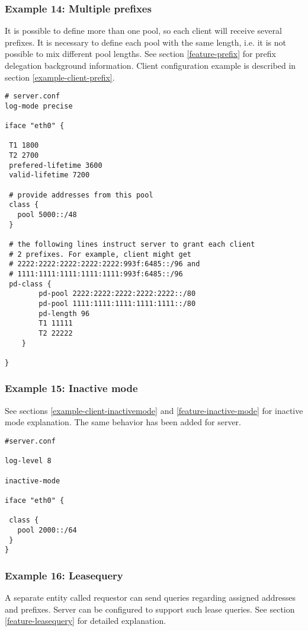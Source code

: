 \subsubsection{Example 14: Multiple prefixes}
\label{example-server-prefixes}
It is possible to define more than one pool, so each client will
receive several prefixes. It is necessary to define each pool with the
same length, i.e. it is not possible to mix different pool lengths.
See section \ref{feature-prefix} for prefix delegation background
information. Client configuration example is described in section
\ref{example-client-prefix}.

\begin{lstlisting}
# server.conf
log-mode precise

iface "eth0" {

 T1 1800
 T2 2700
 prefered-lifetime 3600
 valid-lifetime 7200

 # provide addresses from this pool
 class {
   pool 5000::/48
 }

 # the following lines instruct server to grant each client
 # 2 prefixes. For example, client might get
 # 2222:2222:2222:2222:2222:993f:6485::/96 and
 # 1111:1111:1111:1111:1111:993f:6485::/96
 pd-class {
        pd-pool 2222:2222:2222:2222:2222::/80
        pd-pool 1111:1111:1111:1111:1111::/80
        pd-length 96
        T1 11111
        T2 22222
    }

}
\end{lstlisting}

\subsubsection{Example 15: Inactive mode}
\label{example-server-inactivemode}
See sections \ref{example-client-inactivemode} and
\ref{feature-inactive-mode} for inactive mode explanation.
The same behavior has been added for server.

\begin{lstlisting}
#server.conf

log-level 8

inactive-mode

iface "eth0" {

 class {
   pool 2000::/64
 }
}
\end{lstlisting}

\subsubsection{Example 16: Leasequery}
A separate entity
called requestor can send queries regarding assigned addresses and
prefixes. Server can be configured to support such lease queries.
See section \ref{feature-leasequery} for detailed explanation.

